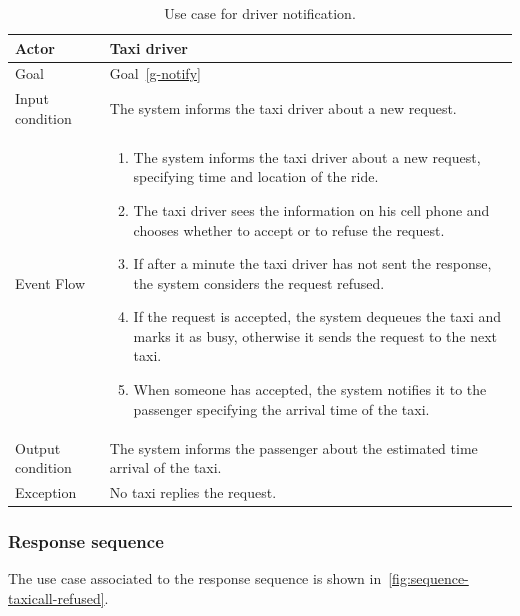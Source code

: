 \begin{table}
\begin{center}
\begin{tabular}{| l | p{} |}
\hline
Actor & Taxi driver \\
\hline
Goal & Goal~\ref{g-notify}
\\
\hline
Input condition & The system informs the taxi driver about a new request.  \\
\hline
Event Flow & \begin{enumerate}
	\item The system informs the taxi driver about a new request, specifying time and location of the ride.
	\item The taxi driver sees the information on his cell phone and chooses whether to accept or to refuse the request.
	\item If after a minute the taxi driver has not sent the response, the system considers the request refused.
	\item If the request is accepted, the system dequeues the taxi and marks it as busy, otherwise it sends the request to the next taxi.
	\item When someone has accepted, the system notifies it to the passenger specifying the arrival time of the taxi.
	\end{enumerate}
\\
\hline
Output condition & The system informs the passenger about the estimated time arrival of the taxi. \\
\hline
Exception & No taxi replies the request. \\
\hline
\end{tabular}
\end{center}
\caption{Use case for driver notification.}
\label{usecase-drivernotification}
\end{table}

\subsubsection{Response sequence}
The use case associated to the response sequence is shown in~\autoref{fig:sequence-taxicall-refused}.

